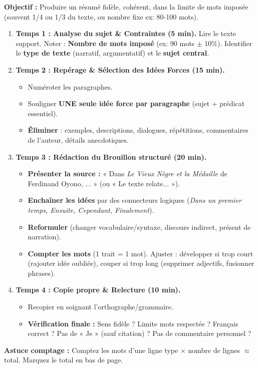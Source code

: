 \documentclass[11pt]{article}
\begin{document}
\begin{methode}
    \textbf{Objectif :} Produire un résumé fidèle, cohérent, dans la limite de mots imposée (souvent 1/4 ou 1/3 du texte, ou nombre fixe ex: 80-100 mots).
    \begin{enumerate}
        \item \textbf{Temps 1 : Analyse du sujet \& Contraintes (5 min).} Lire le texte support. Noter : \textbf{Nombre de mots imposé} (ex: 90 mots $\pm$ 10\%). Identifier le \textbf{type de texte} (narratif, argumentatif) et le \textbf{sujet central}.
        \item \textbf{Temps 2 : Repérage \& Sélection des Idées Forces (15 min).}
              \begin{itemize}
                  \item Numéroter les paragraphes.
                  \item Souligner \textbf{UNE seule idée force par paragraphe} (sujet + prédicat essentiel).
                  \item \textbf{Éliminer} : exemples, descriptions, dialogues, répétitions, commentaires de l'auteur, détails anecdotiques.
              \end{itemize}
        \item \textbf{Temps 3 : Rédaction du Brouillon structuré (20 min).}
              \begin{itemize}
                  \item \textbf{Présenter la source :} « Dans \emph{Le Vieux Nègre et la Médaille} de Ferdinand Oyono, ... » (ou « Le texte relate... »).
                  \item \textbf{Enchaîner les idées} par des connecteurs logiques (\emph{Dans un premier temps, Ensuite, Cependant, Finalement}).
                  \item \textbf{Reformuler} (changer vocabulaire/syntaxe, discours indirect, présent de narration).
                  \item \textbf{Compter les mots} (1 trait = 1 mot). Ajuster : développer si trop court (rajouter idée oubliée), couper si trop long (supprimer adjectifs, fusionner phrases).
              \end{itemize}
        \item \textbf{Temps 4 : Copie propre \& Relecture (10 min).}
              \begin{itemize}
                  \item Recopier en soignant l'orthographe/grammaire.
                  \item \textbf{Vérification finale :} Sens fidèle ? Limite mots respectée ? Français correct ? Pas de « Je » (sauf citation) ? Pas de commentaire personnel ?
              \end{itemize}
    \end{enumerate}
    \textbf{Astuce comptage :} Comptez les mots d'une ligne type $\times$ nombre de lignes $\approx$ total. Marquez le total en bas de page.
\end{methode}
\end{document}
